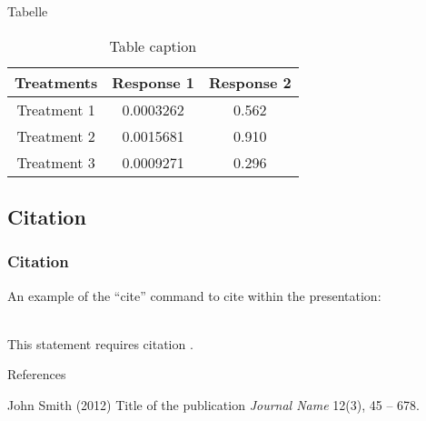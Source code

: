 \begin{frame}{Tabelle}
	\centering
	\begin{table}
		\begin{tabular}{c c c}
			\toprule
			\textbf{Treatments} & \textbf{Response 1} & \textbf{Response 2} \\
			\midrule
			Treatment 1         & 0.0003262           & 0.562               \\
			Treatment 2         & 0.0015681           & 0.910               \\
			Treatment 3         & 0.0009271           & 0.296               \\
			\bottomrule
		\end{tabular}
		\caption{Table caption}
	\end{table}
\end{frame}

\subsection{Citation}

\begin{frame}[Citation]
    \frametitle{Citation}
    An example of the \enquote{cite} command to cite within the presentation:\\~

    This statement requires citation \cite{p1}.
\end{frame}

\begin{frame}{References}
    \footnotesize{
        \begin{thebibliography}{99}
             John Smith (2012)
            \newblock Title of the publication
            \newblock \emph{Journal Name} 12(3), 45 -- 678.
        \end{thebibliography}
    }
\end{frame}